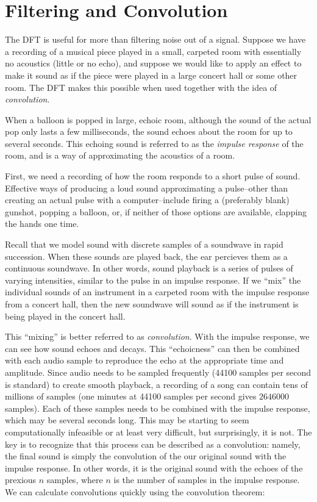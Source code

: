 \section*{Filtering and Convolution} %

The DFT is useful for more than filtering noise out of a signal.
Suppose we have a recording of a musical piece played in a small, carpeted room with essentially no acoustics (little or no echo), and suppose we would like to apply an effect to make it sound as if the piece were played in a large concert hall or some other room.
The DFT makes this possible when used together with the idea of \emph{convolution}.

When a balloon is popped in large, echoic room, although the sound of the actual pop only lasts a few milliseconds, the sound echoes about the room for up to several seconds.
This echoing sound is referred to as the \emph{impulse response} of the room, and is a way of approximating the acoustics of a room.

First, we need a recording of how the room responds to a short pulse of sound.
Effective ways of producing a loud sound approximating a pulse--other than creating an actual pulse with a computer--include firing a (preferably blank) gunshot, popping a balloon, or, if neither of those options are available, clapping the hands one time.

Recall that we model sound with discrete samples of a soundwave in rapid succession.
When these sounds are played back, the ear percieves them as a continuous soundwave.
In other words, sound playback is a series of pulses of varying intensities, similar to the pulse in an impulse response.
If we ``mix'' the individual sounds of an instrument in a carpeted room with the impulse response from a concert hall, then the new soundwave will sound as if the instrument is being played in the concert hall.

This ``mixing'' is better referred to as \emph{convolution}. With the impulse response, we can see how sound echoes and decays.  This ``echoicness'' can then be combined with each audio sample to reproduce the echo at the appropriate time and amplitude.
Since audio needs to be sampled frequently (44100 samples per second is standard) to create smooth playback, a recording of a song can contain tens of millions of samples (one minutes at 44100 samples per second gives $2646000$ samples).
Each of these samples needs to be combined with the impulse response, which may be several seconds long.
This may be starting to seem computationally infeasible or at least very difficult, but surprisingly, it is not.
The key is to recognize that this process can be described as a convolution: namely, the final sound is simply the convolution of the our original sound with the impulse response.
In other words, it is the original sound with the echoes of the prexious $n$ samples, where $n$ is the number of samples in the impulse response.
We can calculate convolutions quickly using the convolution theorem:

